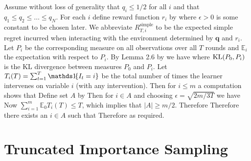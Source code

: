 Assume without loss of generality that $q_i \leq 1/2$ for all $i$ and that $q_1 \leq q_2 \leq \ldots \leq q_N$.
For each $i$ define reward function $r_i$ by
where $\epsilon > 0$ is some constant to be chosen later.
We abbreviate $R_{T,i}^{\text{simple}}$ to be the expected simple regret incurred when interacting with the
environment determined by $\boldsymbol{q}$ and $r_i$. Let $P_i$ be the corresponding measure
on all observations over all $T$ rounds and $\mathbb E_i$ the expectation with respect to $P_i$. By Lemma 2.6 by \cite{Tsy08} we have
where $\operatorname{KL}(P_0, P_i)$ is the KL divergence between measures $P_0$ and $P_i$.
Let $T_i(T) = \sum_{t=1}^T \ind{I_t = i}$ be the total number of times the learner intervenes on variable $i$ (with any intervention). 
Then for $i \leq m$ a computation shows that 
Define set $A$ by
Then for $i \in A$ and choosing $\epsilon = \sqrt{2m/3T}$ we have
Now $\sum_{i=1}^m \mathbb E_0 T_i(T) \leq T$, which implies that $|A| \geq m/2$.
Therefore
Therefore there exists an $i \in A$ such that
Therefore
as required.


\section*{Truncated Importance Sampling}\label{sec:truncated}

